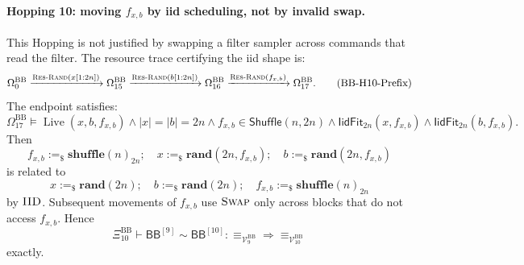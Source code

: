 \documentclass{report}
\theoremstyle{defn_style}
\providecommand{\Live}{\operatorname{Live}}
\providecommand{\HopBB}[1]{\mathsf{BB}^{[#1]}}
\begin{document}
\paragraph{Hopping 10: moving \(f_{x,b}\) by iid scheduling, not by invalid swap.}
This Hopping is not justified by swapping a filter sampler across commands that
read the filter.  The resource trace certifying the iid shape is:
\[
\Omega^{\mathrm{BB}}_0
\xrightarrow{\textsc{Res-Rand}(x[1{:}2n])}
\Omega^{\mathrm{BB}}_{15}
\xrightarrow{\textsc{Res-Rand}(b[1{:}2n])}
\Omega^{\mathrm{BB}}_{16}
\xrightarrow{\textsc{Res-Rand}(f_{x,b})}
\Omega^{\mathrm{BB}}_{17}.
\tag{BB-H10-Prefix}\label{BB-H10-Prefix}
\]
The endpoint satisfies:
\[
\Omega^{\mathrm{BB}}_{17}
\models
\Live(x,b,f_{x,b})
\land
|x|=|b|=2n
\land
f_{x,b}\in\mathsf{Shuffle}(n,2n)
\land
\mathsf{IidFit}_{2n}(x,f_{x,b})
\land
\mathsf{IidFit}_{2n}(b,f_{x,b}).
\tag{BB-H10-IIDReq}
\]
Then
\[
f_{x,b}:=_\$\mathbf{shuffle}(n)_{2n};
\quad
x:=_\$\mathbf{rand}(2n,f_{x,b});
\quad
b:=_\$\mathbf{rand}(2n,f_{x,b})
\]
is related to
\[
x:=_\$\mathbf{rand}(2n);
\quad
b:=_\$\mathbf{rand}(2n);
\quad
f_{x,b}:=_\$\mathbf{shuffle}(n)_{2n}
\]
by \(\textsc{IID}\).  Subsequent movements of \(f_{x,b}\) use
\(\textsc{Swap}\) only across blocks that do not access \(f_{x,b}\).  Hence
\[
\Xi^{\mathrm{BB}}_{10}
\vdash
\HopBB{9}\sim\HopBB{10}:
\equiv_{\mathcal V^{\mathrm{BB}}_9}
\Longrightarrow
\equiv_{\mathcal V^{\mathrm{BB}}_{10}}
\tag{BB-H10-Rel}\label{BB-H10-Rel}
\]
exactly.
\end{document}
